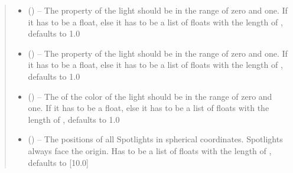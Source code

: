 \documentclass[letterpaper,10pt,english]{sphinxmanual}
\begin{document}
\begin{fulllineitems}
\begin{fulllineitems}
\begin{quote}
\begin{description}
\begin{itemize}
\item {} 
 (\sphinxstyleliteralemphasis{\sphinxupquote{, }}) -- The  property of the light should be in the range of zero and one. If  it has to be a float, else it has to be a list of floats with the length of , defaults to 1.0

\item {} 
 (\sphinxstyleliteralemphasis{\sphinxupquote{, }}) -- The  property of the light should be in the range of zero and one. If  it has to be a float, else it has to be a list of floats with the length of , defaults to 1.0

\item {} 
 (\sphinxstyleliteralemphasis{\sphinxupquote{, }}) -- The  of the color of the light should be in the range of zero and one. If  it has to be a float, else it has to be a list of floats with the length of , defaults to 1.0

\item {} 
 (\sphinxstyleliteralemphasis{\sphinxupquote{, }}) -- The positions of all Spotlights in spherical coordinates. Spotlights always face the origin. Has to be a list of floats with the length of , defaults to {[}10.0{]}


\end{itemize}
\end{description}
\end{quote}
\end{fulllineitems}
\end{fulllineitems}
\end{document}
